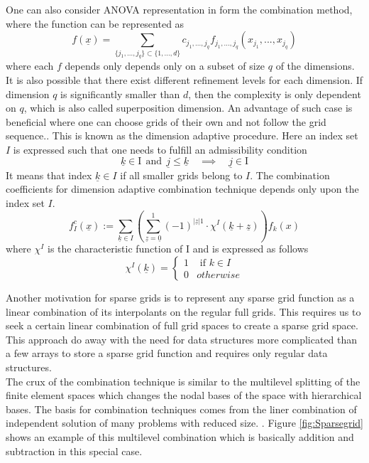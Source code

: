 One can also consider ANOVA representation in form the combination method, where the function can be represented as
\begin{equation}
	f(\underline{x}) = \sum_{\{j_1,...,j_q\}\subset\{1,...,d\}} c_{j_1,...,j_q} f_{j_1,...,j_q} \left( x_{j_1},...,x_{j_q} \right)
\end{equation}
where each $f$ depends only depends only on a subset of size $q$ of the dimensions. It is also possible that there exist different refinement levels for each dimension. If dimension $q$ is significantly smaller than $d$, then the complexity is only dependent on $q$, which is also called superposition dimension. An advantage of such case is beneficial where one can choose grids of their own and not follow the grid sequence.. This is known as the dimension adaptive procedure. Here an index set $I$ is expressed such that one needs to fulfill an admissibility condition
\begin{equation}
	\underline{k} \in \text{I} \ \ \text{and} \ \ \underline{j}\le \underline{k} \quad \implies \quad \underline{j}\in \text{I}
\end{equation}
It means that index $\underline{k} \in I$ if all smaller grids belong to $I$. The combination coefficients for dimension adaptive combination technique depends only upon the index set $I$. 
\begin{equation}
    f_I^c\left(\underline{x}\right) := \sum\limits_{\underline{k} \in I}\left( \sum\limits_{\underline{z} = \underline{0}}^{1}\left(-1\right)^{\left|\underline{z}\right|1}\cdot \chi^{I}\left(\underline{k}+\underline{z}\right)\right)f_{k}\left(x\right)
\end{equation}
where $\chi^{I}$ is the characteristic function of I and is expressed as follows
\begin{equation}
     \chi^{I}(\underline{k}) =
     \begin{cases}
        1 &  \text{ if } k \in I\\
        0 & otherwise 
     \end{cases}
\end{equation}

Another motivation for sparse grids is to represent any sparse grid function as a linear combination of its interpolants on the regular full grids. This requires us to seek a certain linear combination of full grid spaces to create a sparse grid space. This approach do away with the need for data structures more complicated than a few arrays to store a sparse grid function and requires only regular data structures.\cite{Griebel1992b} \\
The crux of the combination technique is similar to the multilevel splitting of the finite element spaces which changes the nodal bases of the space with hierarchical bases. \cite{Yserentant1986} The basis for combination techniques comes from the liner combination of independent solution of many problems with reduced size. \cite{Griebel1992}. Figure \ref{fig:Sparsegrid} shows an example of this multilevel combination which is basically addition and subtraction in this special case.\\

